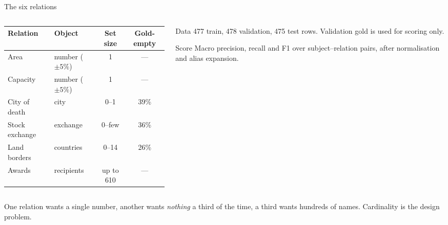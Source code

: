\documentclass[aspectratio=169,10pt]{beamer}
\begin{document}
\begin{frame}{The six relations}
  \begin{columns}[T]
    \begin{column}{0.56\textwidth}
      \small\setlength{\tabcolsep}{4pt}
      \begin{tabular}{@{}llcc@{}}
        \toprule
        Relation & Object & Set size & Gold-empty \\
        \midrule
        Area & number ($\pm5\%$) & 1 & --- \\
        Capacity & number ($\pm5\%$) & 1 & --- \\
        City of death & city & 0--1 & 39\% \\
        Stock exchange & exchange & 0--few & 36\% \\
        Land borders & countries & 0--14 & 26\% \\
        Awards & recipients & up to 610 & --- \\
        \bottomrule
      \end{tabular}
    \end{column}
    \begin{column}{0.40\textwidth}
      \begin{block}{Data}
        477 train, 478 validation, 475 test rows. Validation gold is used
        for scoring only.
      \end{block}
      \begin{block}{Score}
        Macro precision, recall and F1 over subject--relation pairs, after
        normalisation and alias expansion.
      \end{block}
    \end{column}
  \end{columns}

  \vspace{3mm}
  One relation wants a single number, another wants \emph{nothing} a third of
  the time, a third wants hundreds of names. \alert{Cardinality is the design
  problem.}
\end{frame}
\end{document}
